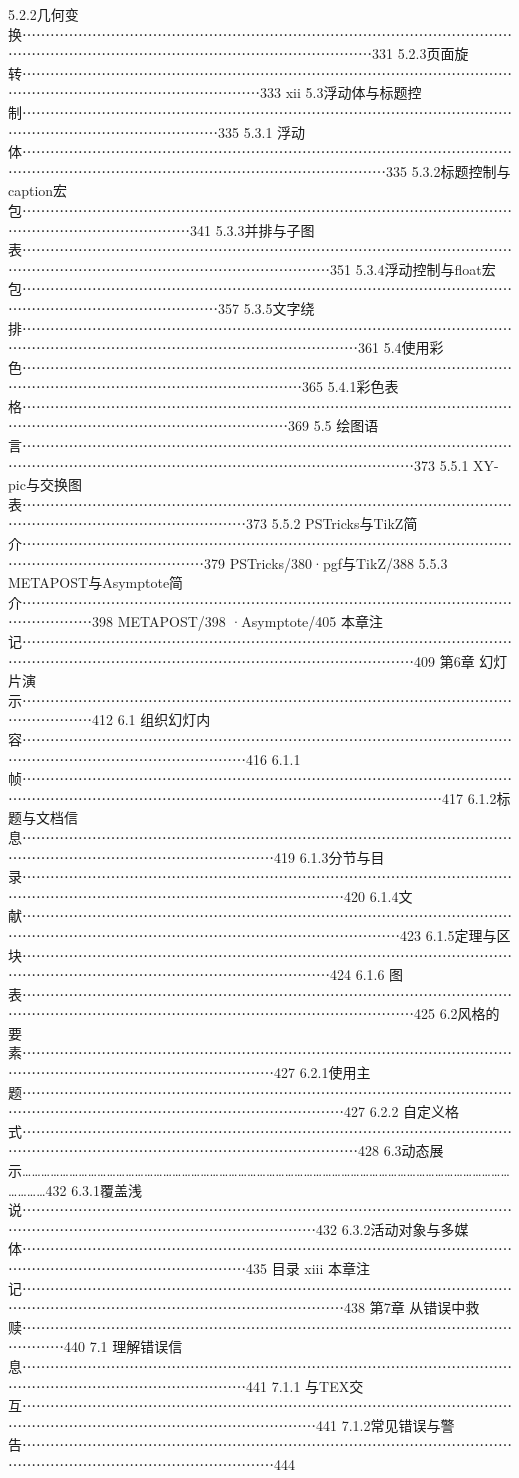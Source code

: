 \documentclass[UTF8]{ctexart}
\begin{document}
5.2.2几何变换⋯⋯⋯⋯⋯⋯⋯⋯⋯⋯⋯⋯⋯⋯⋯⋯⋯⋯⋯⋯⋯⋯⋯⋯⋯⋯⋯⋯⋯⋯⋯⋯⋯⋯⋯⋯⋯⋯⋯⋯⋯⋯⋯⋯⋯⋯⋯⋯⋯⋯⋯⋯⋯⋯⋯⋯⋯⋯⋯⋯⋯331
5.2.3页面旋转⋯⋯⋯⋯⋯⋯⋯⋯⋯⋯⋯⋯⋯⋯⋯⋯⋯⋯⋯⋯⋯⋯⋯⋯⋯⋯⋯⋯⋯⋯⋯⋯⋯⋯⋯⋯⋯⋯⋯⋯⋯⋯⋯⋯⋯⋯⋯⋯⋯⋯⋯⋯⋯333
xii
5.3浮动体与标题控制⋯⋯⋯⋯⋯⋯⋯⋯⋯⋯⋯⋯⋯⋯⋯⋯⋯⋯⋯⋯⋯⋯⋯⋯⋯⋯⋯⋯⋯⋯⋯⋯⋯⋯⋯⋯⋯⋯⋯⋯⋯⋯⋯⋯⋯⋯⋯⋯⋯⋯335
5.3.1 浮动体⋯⋯⋯⋯⋯⋯⋯⋯⋯⋯⋯⋯⋯⋯⋯⋯⋯⋯⋯⋯⋯⋯⋯⋯⋯⋯⋯⋯⋯⋯⋯⋯⋯⋯⋯⋯⋯⋯⋯⋯⋯⋯⋯⋯⋯⋯⋯⋯⋯⋯⋯⋯⋯⋯⋯⋯⋯⋯⋯⋯⋯⋯335
5.3.2标题控制与caption宏包⋯⋯⋯⋯⋯⋯⋯⋯⋯⋯⋯⋯⋯⋯⋯⋯⋯⋯⋯⋯⋯⋯⋯⋯⋯⋯⋯⋯⋯⋯⋯⋯⋯⋯⋯⋯⋯⋯⋯⋯⋯⋯⋯⋯⋯⋯⋯⋯341
5.3.3并排与子图表⋯⋯⋯⋯⋯⋯⋯⋯⋯⋯⋯⋯⋯⋯⋯⋯⋯⋯⋯⋯⋯⋯⋯⋯⋯⋯⋯⋯⋯⋯⋯⋯⋯⋯⋯⋯⋯⋯⋯⋯⋯⋯⋯⋯⋯⋯⋯⋯⋯⋯⋯⋯⋯⋯⋯⋯⋯⋯351
5.3.4浮动控制与float宏包⋯⋯⋯⋯⋯⋯⋯⋯⋯⋯⋯⋯⋯⋯⋯⋯⋯⋯⋯⋯⋯⋯⋯⋯⋯⋯⋯⋯⋯⋯⋯⋯⋯⋯⋯⋯⋯⋯⋯⋯⋯⋯⋯⋯⋯⋯⋯⋯⋯⋯357
5.3.5文字绕排⋯⋯⋯⋯⋯⋯⋯⋯⋯⋯⋯⋯⋯⋯⋯⋯⋯⋯⋯⋯⋯⋯⋯⋯⋯⋯⋯⋯⋯⋯⋯⋯⋯⋯⋯⋯⋯⋯⋯⋯⋯⋯⋯⋯⋯⋯⋯⋯⋯⋯⋯⋯⋯⋯⋯⋯⋯⋯⋯⋯361
5.4使用彩色⋯⋯⋯⋯⋯⋯⋯⋯⋯⋯⋯⋯⋯⋯⋯⋯⋯⋯⋯⋯⋯⋯⋯⋯⋯⋯⋯⋯⋯⋯⋯⋯⋯⋯⋯⋯⋯⋯⋯⋯⋯⋯⋯⋯⋯⋯⋯⋯⋯⋯⋯⋯⋯⋯⋯⋯365
5.4.1彩色表格⋯⋯⋯⋯⋯⋯⋯⋯⋯⋯⋯⋯⋯⋯⋯⋯⋯⋯⋯⋯⋯⋯⋯⋯⋯⋯⋯⋯⋯⋯⋯⋯⋯⋯⋯⋯⋯⋯⋯⋯⋯⋯⋯⋯⋯⋯⋯⋯⋯⋯⋯⋯⋯⋯⋯369
5.5 绘图语言⋯⋯⋯⋯⋯⋯⋯⋯⋯⋯⋯⋯⋯⋯⋯⋯⋯⋯⋯⋯⋯⋯⋯⋯⋯⋯⋯⋯⋯⋯⋯⋯⋯⋯⋯⋯⋯⋯⋯⋯⋯⋯⋯⋯⋯⋯⋯⋯⋯⋯⋯⋯⋯⋯⋯⋯⋯⋯⋯⋯⋯⋯⋯⋯373
5.5.1 XY-pic与交换图表⋯⋯⋯⋯⋯⋯⋯⋯⋯⋯⋯⋯⋯⋯⋯⋯⋯⋯⋯⋯⋯⋯⋯⋯⋯⋯⋯⋯⋯⋯⋯⋯⋯⋯⋯⋯⋯⋯⋯⋯⋯⋯⋯⋯⋯⋯⋯⋯⋯⋯⋯⋯373
5.5.2 PSTricks与TikZ简介⋯⋯⋯⋯⋯⋯⋯⋯⋯⋯⋯⋯⋯⋯⋯⋯⋯⋯⋯⋯⋯⋯⋯⋯⋯⋯⋯⋯⋯⋯⋯⋯⋯⋯⋯⋯⋯⋯⋯⋯⋯⋯⋯⋯⋯⋯⋯⋯⋯379
PSTricks/380·pgf与TikZ/388
5.5.3 METAPOST与Asymptote简介⋯⋯⋯⋯⋯⋯⋯⋯⋯⋯⋯⋯⋯⋯⋯⋯⋯⋯⋯⋯⋯⋯⋯⋯⋯⋯⋯⋯⋯⋯⋯⋯⋯⋯⋯⋯⋯⋯⋯⋯⋯398
METAPOST/398   ·Asymptote/405
本章注记⋯⋯⋯⋯⋯⋯⋯⋯⋯⋯⋯⋯⋯⋯⋯⋯⋯⋯⋯⋯⋯⋯⋯⋯⋯⋯⋯⋯⋯⋯⋯⋯⋯⋯⋯⋯⋯⋯⋯⋯⋯⋯⋯⋯⋯⋯⋯⋯⋯⋯⋯⋯⋯⋯⋯⋯⋯⋯⋯⋯⋯⋯⋯⋯409
第6章	幻灯片演示⋯⋯⋯⋯⋯⋯⋯⋯⋯⋯⋯⋯⋯⋯⋯⋯⋯⋯⋯⋯⋯⋯⋯⋯⋯⋯⋯⋯⋯⋯⋯⋯⋯⋯⋯⋯⋯⋯⋯⋯⋯412
6.1 组织幻灯内容⋯⋯⋯⋯⋯⋯⋯⋯⋯⋯⋯⋯⋯⋯⋯⋯⋯⋯⋯⋯⋯⋯⋯⋯⋯⋯⋯⋯⋯⋯⋯⋯⋯⋯⋯⋯⋯⋯⋯⋯⋯⋯⋯⋯⋯⋯⋯⋯⋯⋯⋯⋯416
6.1.1 帧⋯⋯⋯⋯⋯⋯⋯⋯⋯⋯⋯⋯⋯⋯⋯⋯⋯⋯⋯⋯⋯⋯⋯⋯⋯⋯⋯⋯⋯⋯⋯⋯⋯⋯⋯⋯⋯⋯⋯⋯⋯⋯⋯⋯⋯⋯⋯⋯⋯⋯⋯⋯⋯⋯⋯⋯⋯⋯⋯⋯⋯⋯⋯⋯⋯⋯417
6.1.2标题与文档信息⋯⋯⋯⋯⋯⋯⋯⋯⋯⋯⋯⋯⋯⋯⋯⋯⋯⋯⋯⋯⋯⋯⋯⋯⋯⋯⋯⋯⋯⋯⋯⋯⋯⋯⋯⋯⋯⋯⋯⋯⋯⋯⋯⋯⋯⋯⋯⋯⋯⋯⋯⋯⋯⋯419
6.1.3分节与目录⋯⋯⋯⋯⋯⋯⋯⋯⋯⋯⋯⋯⋯⋯⋯⋯⋯⋯⋯⋯⋯⋯⋯⋯⋯⋯⋯⋯⋯⋯⋯⋯⋯⋯⋯⋯⋯⋯⋯⋯⋯⋯⋯⋯⋯⋯⋯⋯⋯⋯⋯⋯⋯⋯⋯⋯⋯⋯⋯420
6.1.4文献⋯⋯⋯⋯⋯⋯⋯⋯⋯⋯⋯⋯⋯⋯⋯⋯⋯⋯⋯⋯⋯⋯⋯⋯⋯⋯⋯⋯⋯⋯⋯⋯⋯⋯⋯⋯⋯⋯⋯⋯⋯⋯⋯⋯⋯⋯⋯⋯⋯⋯⋯⋯⋯⋯⋯⋯⋯⋯⋯⋯⋯⋯⋯423
6.1.5定理与区块⋯⋯⋯⋯⋯⋯⋯⋯⋯⋯⋯⋯⋯⋯⋯⋯⋯⋯⋯⋯⋯⋯⋯⋯⋯⋯⋯⋯⋯⋯⋯⋯⋯⋯⋯⋯⋯⋯⋯⋯⋯⋯⋯⋯⋯⋯⋯⋯⋯⋯⋯⋯⋯⋯⋯⋯⋯⋯424
6.1.6 图表⋯⋯⋯⋯⋯⋯⋯⋯⋯⋯⋯⋯⋯⋯⋯⋯⋯⋯⋯⋯⋯⋯⋯⋯⋯⋯⋯⋯⋯⋯⋯⋯⋯⋯⋯⋯⋯⋯⋯⋯⋯⋯⋯⋯⋯⋯⋯⋯⋯⋯⋯⋯⋯⋯⋯⋯⋯⋯⋯⋯⋯⋯⋯⋯425
6.2风格的要素⋯⋯⋯⋯⋯⋯⋯⋯⋯⋯⋯⋯⋯⋯⋯⋯⋯⋯⋯⋯⋯⋯⋯⋯⋯⋯⋯⋯⋯⋯⋯⋯⋯⋯⋯⋯⋯⋯⋯⋯⋯⋯⋯⋯⋯⋯⋯⋯⋯⋯⋯⋯⋯⋯427
6.2.1使用主题⋯⋯⋯⋯⋯⋯⋯⋯⋯⋯⋯⋯⋯⋯⋯⋯⋯⋯⋯⋯⋯⋯⋯⋯⋯⋯⋯⋯⋯⋯⋯⋯⋯⋯⋯⋯⋯⋯⋯⋯⋯⋯⋯⋯⋯⋯⋯⋯⋯⋯⋯⋯⋯⋯⋯⋯⋯⋯⋯427
6.2.2 自定义格式⋯⋯⋯⋯⋯⋯⋯⋯⋯⋯⋯⋯⋯⋯⋯⋯⋯⋯⋯⋯⋯⋯⋯⋯⋯⋯⋯⋯⋯⋯⋯⋯⋯⋯⋯⋯⋯⋯⋯⋯⋯⋯⋯⋯⋯⋯⋯⋯⋯⋯⋯⋯⋯⋯⋯⋯⋯⋯⋯⋯428
6.3动态展示……………………………………………………………………………………………………………………………………………………432
6.3.1覆盖浅说⋯⋯⋯⋯⋯⋯⋯⋯⋯⋯⋯⋯⋯⋯⋯⋯⋯⋯⋯⋯⋯⋯⋯⋯⋯⋯⋯⋯⋯⋯⋯⋯⋯⋯⋯⋯⋯⋯⋯⋯⋯⋯⋯⋯⋯⋯⋯⋯⋯⋯⋯⋯⋯⋯⋯⋯⋯432
6.3.2活动对象与多媒体⋯⋯⋯⋯⋯⋯⋯⋯⋯⋯⋯⋯⋯⋯⋯⋯⋯⋯⋯⋯⋯⋯⋯⋯⋯⋯⋯⋯⋯⋯⋯⋯⋯⋯⋯⋯⋯⋯⋯⋯⋯⋯⋯⋯⋯⋯⋯⋯⋯⋯⋯⋯435
目录	xiii
本章注记⋯⋯⋯⋯⋯⋯⋯⋯⋯⋯⋯⋯⋯⋯⋯⋯⋯⋯⋯⋯⋯⋯⋯⋯⋯⋯⋯⋯⋯⋯⋯⋯⋯⋯⋯⋯⋯⋯⋯⋯⋯⋯⋯⋯⋯⋯⋯⋯⋯⋯⋯⋯⋯⋯⋯⋯⋯⋯⋯438
第7章	从错误中救赎⋯⋯⋯⋯⋯⋯⋯⋯⋯⋯⋯⋯⋯⋯⋯⋯⋯⋯⋯⋯⋯⋯⋯⋯⋯⋯⋯⋯⋯⋯⋯⋯⋯⋯⋯⋯⋯⋯⋯440
7.1 理解错误信息⋯⋯⋯⋯⋯⋯⋯⋯⋯⋯⋯⋯⋯⋯⋯⋯⋯⋯⋯⋯⋯⋯⋯⋯⋯⋯⋯⋯⋯⋯⋯⋯⋯⋯⋯⋯⋯⋯⋯⋯⋯⋯⋯⋯⋯⋯⋯⋯⋯⋯⋯⋯441
7.1.1 与TEX交互⋯⋯⋯⋯⋯⋯⋯⋯⋯⋯⋯⋯⋯⋯⋯⋯⋯⋯⋯⋯⋯⋯⋯⋯⋯⋯⋯⋯⋯⋯⋯⋯⋯⋯⋯⋯⋯⋯⋯⋯⋯⋯⋯⋯⋯⋯⋯⋯⋯⋯⋯⋯⋯⋯⋯⋯⋯441
7.1.2常见错误与警告⋯⋯⋯⋯⋯⋯⋯⋯⋯⋯⋯⋯⋯⋯⋯⋯⋯⋯⋯⋯⋯⋯⋯⋯⋯⋯⋯⋯⋯⋯⋯⋯⋯⋯⋯⋯⋯⋯⋯⋯⋯⋯⋯⋯⋯⋯⋯⋯⋯⋯⋯⋯⋯⋯444
\end{document}
